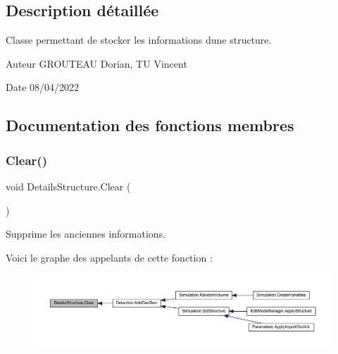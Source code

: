 \subsection{Description détaillée}
Classe permettant de stocker les informations d\textquotesingle{}une structure. 

\begin{DoxyAuthor}{Auteur}
G\+R\+O\+U\+T\+E\+AU Dorian, TU Vincent 
\end{DoxyAuthor}
\begin{DoxyDate}{Date}
08/04/2022 
\end{DoxyDate}


\subsection{Documentation des fonctions membres}
\mbox{\label{class_details_structure_a4653aac26e25e56d4dd6b5f45ad9f4ef}} 
\subsubsection{\texorpdfstring{Clear()}{Clear()}}
{\footnotesize\ttfamily void Details\+Structure.\+Clear (\begin{DoxyParamCaption}{ }\end{DoxyParamCaption})\hspace{0.3cm}{\ttfamily [inline]}}



Supprime les anciennes informations. 

Voici le graphe des appelants de cette fonction \+:
\nopagebreak
\begin{figure}[H]
\begin{center}
\leavevmode
\includegraphics[width=350pt]{class_details_structure_a4653aac26e25e56d4dd6b5f45ad9f4ef_icgraph}
\end{center}
\end{figure}
\mbox{\label{class_details_structure_a58ff01a7fcdfc6b081aebb4ae42d26f0}} 
